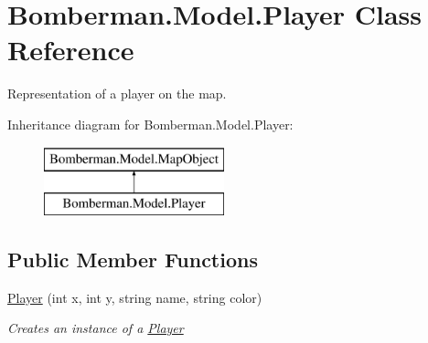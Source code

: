 \hypertarget{class_bomberman_1_1_model_1_1_player}{}\section{Bomberman.\+Model.\+Player Class Reference}
\label{class_bomberman_1_1_model_1_1_player}


Representation of a player on the map.  


Inheritance diagram for Bomberman.\+Model.\+Player\+:\begin{figure}[H]
\begin{center}
\leavevmode
\includegraphics[height=2.000000cm]{class_bomberman_1_1_model_1_1_player}
\end{center}
\end{figure}
\subsection*{Public Member Functions}
\begin{DoxyCompactItemize}
\item 
\mbox{\hyperlink{class_bomberman_1_1_model_1_1_player_a98b6601d7cd1bce7d53c4b6a6fa5dd17}{Player}} (int x, int y, string name, string color)
\begin{DoxyCompactList}\small\item\em Creates an instance of a \mbox{\hyperlink{class_bomberman_1_1_model_1_1_player}{Player}} \end{DoxyCompactList}\end{DoxyCompactItemize}
